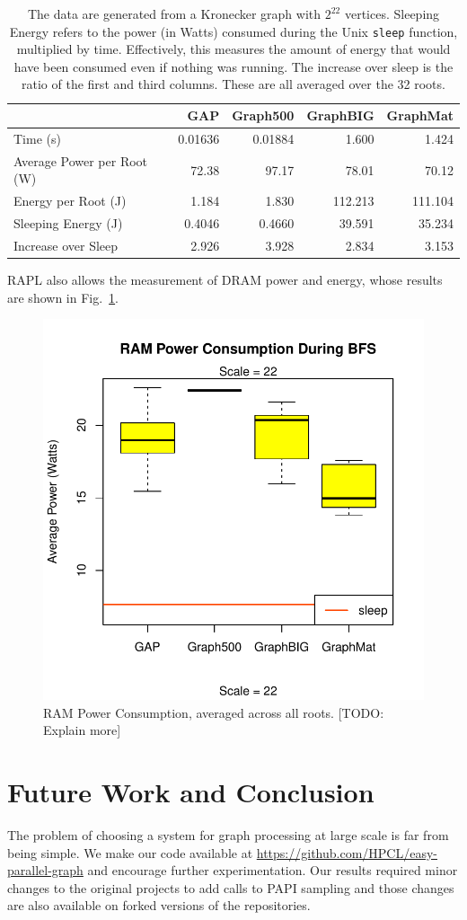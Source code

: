 \documentclass{llncs}
\begin{document}
\begin{table}
	\caption{The data are generated from a Kronecker graph with $2^{22}$ vertices. Sleeping Energy refers to the power (in Watts) consumed during the Unix \texttt{sleep} function, multiplied by time. Effectively, this measures the amount of energy that would have been consumed even if nothing was running. The increase over sleep is the ratio of the first and third columns. These are all averaged over the 32 roots.}
	\centering
	\begin{tabular}{l|r|r|r|r}
			&	GAP  &    Graph500 & GraphBIG & GraphMat \\ \hline
		Time (s) &  0.01636 & 0.01884 & 1.600 & 1.424 \\
		Average Power per Root (W) & 72.38 & 97.17 & 78.01 & 70.12 \\
		Energy per Root (J) &	1.184 & 1.830 & 112.213 & 111.104 \\
		Sleeping Energy (J) & 0.4046  & 0.4660 & 39.591 &  35.234 \\
		Increase over Sleep & 2.926 & 3.928 & 2.834 & 3.153
	\end{tabular}
\end{table}

RAPL also allows the measurement of DRAM power and energy, whose results are shown in Fig.~\ref{fig:ram-power}.

\begin{figure}
	\centering
	\includegraphics[width=0.6\linewidth, trim=0 36pt 18pt 0, clip]{graphics/bfs_ram_power.pdf}
	\caption{RAM Power Consumption, averaged across all roots. [TODO: Explain more]}
	\label{fig:ram-power}
\end{figure}

\section{Future Work and Conclusion}
The problem of choosing a system for graph processing at large scale is far from being simple. We make our code available at \url{https://github.com/HPCL/easy-parallel-graph} and encourage further experimentation. Our results required minor changes to the original projects to add calls to PAPI sampling and those changes are also available on forked versions of the repositories.
\end{document}
